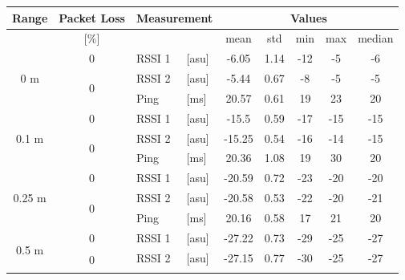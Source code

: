 \begin{table}[H]
    \centering
    \begin{tabular}{|c|c|l|l|c|c|c|c|c|}
    \hline
        Range & Packet Loss & \multicolumn{2}{l|}{Measurement} & \multicolumn{5}{c|}{Values} \\\hline
        [meters] & [\%] & \multicolumn{2}{l|}{} & mean & std & min & max & median \\\hline\hline
        \multirow{3}{*}{0 m} & \multirow{1}{*}{0} & RSSI 1 & [asu] & -6.05 & 1.14 & -12 & -5 & -6 \\\cline{2-9}\cline{2-9}
        & \multirow{2}{*}{0} & RSSI 2 & [asu] & -5.44 & 0.67 & -8 & -5 & -5 \\\cline{3-9}
        && Ping & [ms] & 20.57 & 0.61 & 19 & 23 & 20 \\\hline\hline
        \multirow{3}{*}{0.1 m} & \multirow{1}{*}{0} & RSSI 1 & [asu] & -15.5 & 0.59 & -17 & -15 & -15 \\\cline{2-9}\cline{2-9}
        & \multirow{2}{*}{0} & RSSI 2 & [asu] & -15.25 & 0.54 & -16 & -14 & -15 \\\cline{3-9}
        && Ping & [ms] & 20.36 & 1.08 & 19 & 30 & 20 \\\hline\hline
        \multirow{3}{*}{0.25 m} & \multirow{1}{*}{0} & RSSI 1 & [asu] & -20.59 & 0.72 & -23 & -20 & -20 \\\cline{2-9}\cline{2-9}
        & \multirow{2}{*}{0} & RSSI 2 & [asu] & -20.58 & 0.53 & -22 & -20 & -21 \\\cline{3-9}
        && Ping & [ms] & 20.16 & 0.58 & 17 & 21 & 20 \\\hline\hline
        \multirow{3}{*}{0.5 m} & \multirow{1}{*}{0} & RSSI 1 & [asu] & -27.22 & 0.73 & -29 & -25 & -27 \\\cline{2-9}\cline{2-9}
        & \multirow{2}{*}{0} & RSSI 2 & [asu] & -27.15 & 0.77 & -30 & -25 & -27 \\\cline{3-9}

\end{tabular}
\end{table}
